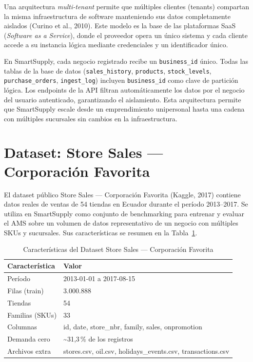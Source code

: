 \documentclass[12pt, a4paper]{report}
\begin{document}
Una arquitectura \textit{multi-tenant} permite que múltiples clientes (tenants) compartan
la misma infraestructura de software manteniendo sus datos completamente aislados
(Curino et al., 2010). Este modelo es la base de las plataformas SaaS
(\textit{Software as a Service}), donde el proveedor opera un único sistema y cada cliente
accede a su instancia lógica mediante credenciales y un identificador único.

En SmartSupply, cada negocio registrado recibe un \texttt{business\_id} único. Todas las
tablas de la base de datos (\texttt{sales\_history}, \texttt{products}, \texttt{stock\_levels},
\texttt{purchase\_orders}, \texttt{ingest\_log}) incluyen \texttt{business\_id} como clave
de partición lógica. Los endpoints de la API filtran automáticamente los datos por el
negocio del usuario autenticado, garantizando el aislamiento. Esta arquitectura permite
que SmartSupply escale desde un emprendimiento unipersonal hasta una cadena con
múltiples sucursales sin cambios en la infraestructura.

\section{Dataset: Store Sales — Corporación Favorita}

El dataset público Store Sales — Corporación Favorita (Kaggle, 2017) contiene datos
reales de ventas de 54 tiendas en Ecuador durante el período 2013--2017. Se utiliza en
SmartSupply como conjunto de benchmarking para entrenar y evaluar el AMS sobre un
volumen de datos representativo de un negocio con múltiples SKUs y sucursales. Sus
características se resumen en la Tabla~\ref{tab:dataset}.

\begin{table}[H]
  \centering
  \caption{Características del Dataset Store Sales — Corporación Favorita}
  \label{tab:dataset}
  \begin{tabular}{|l|l|}
    \hline
    \textbf{Característica} & \textbf{Valor} \\
    \hline
    Período          & 2013-01-01 a 2017-08-15 \\
    Filas (train)    & 3.000.888 \\
    Tiendas          & 54 \\
    Familias (SKUs)  & 33 \\
    Columnas         & id, date, store\_nbr, family, sales, onpromotion \\
    Demanda cero     & \textasciitilde 31,3\,\% de los registros \\
    Archivos extra   & stores.csv, oil.csv, holidays\_events.csv, transactions.csv \\
    \hline
  \end{tabular}
\end{table}
\end{document}
